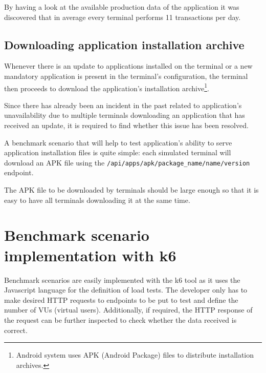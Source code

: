 \documentclass[12pt, a4paper]{article}
\let\oldsection\section
\renewcommand\section{\clearpage\oldsection}
\begin{document}
By having a look at the available production data of the application it was discovered that in average every terminal performs 11 transactions per day.

\subsection{Downloading application installation archive}

Whenever there is an update to applications installed on the terminal or a new mandatory application is present in the terminal's configuration, the terminal then proceeds to download the application's installation archive\footnote{Android system uses APK (Android Package) files to distribute installation archives.}.

Since there has already been an incident in the past related to application's unavailability due to multiple terminals downloading an application that has received an update, it is required to find whether this issue has been resolved. 

A benchmark scenario that will help to test application's ability to serve application installation files is quite simple: each simulated terminal will download an APK file using the \texttt{/api/apps/apk/{package\_name}/{name}/{version}} endpoint.

The APK file to be downloaded by terminals should be large enough so that it is easy to have all terminals downloading it at the same time.

\section{Benchmark scenario implementation with k6}

Benchmark scenarios are easily implemented with the k6 tool as it uses the Javascript language for the definition of load tests.
The developer only has to make desired HTTP requests to endpoints to be put to test and define the number of VUs (virtual users).
Additionally, if required, the HTTP response of the request can be further inspected to check whether the data received is correct.
\end{document}
